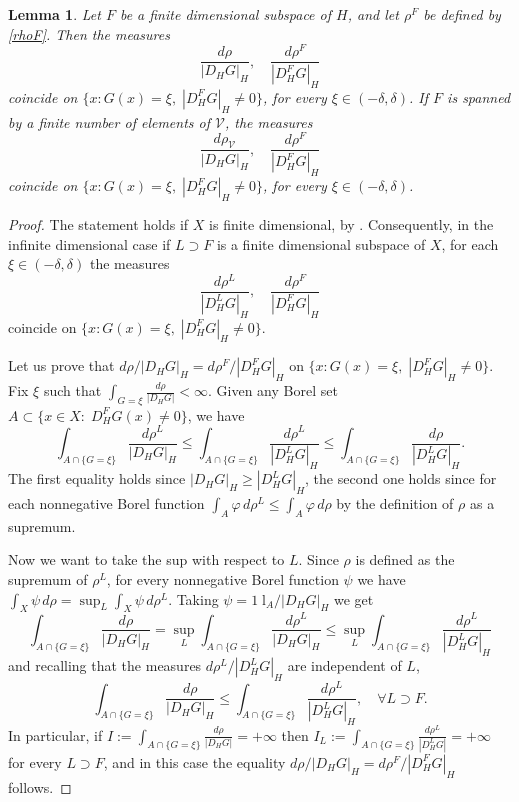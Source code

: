 \documentclass[reqno,twoside,12pt]{amsart}
\newtheorem{Lemma}[Theorem]{Lemma}
\begin{document}
\begin{Lemma}
\label{Le:sofferenza}
Let $F$ be a finite dimensional subspace of  $H$, and let $\rho^F$  be defined by \eqref{rhoF}. Then the measures 
$$\frac{d\rho}{|D_H G|_H} ,   \quad \frac{d\rho^F}{|D_H^FG|_H} $$
coincide on $\{ x: G(x) = \xi, \; |D_H^FG|_H\neq 0\}$, for every $\xi \in (-\delta, \delta)$. 
If $F$ is spanned by a finite number of elements of $\mathcal V$, the measures
$$ \frac{d\rho_{\mathcal V}}{|D_H G|_H} , \quad \frac{d\rho^F}{|D_H^FG|_H} $$
coincide on $\{ x: G(x) = \xi, \; |D_H^FG|_H\neq 0\}$, for every $\xi \in (-\delta, \delta)$. 
\end{Lemma}
\begin{proof}
The statement holds if $X$ is finite dimensional, by  \cite[Cor. 6.3]{Feyel}. Consequently, in the infinite dimensional case if $L\supset F$ is a finite dimensional subspace of $X$, for each  $\xi \in (-\delta, \delta)$ the measures
$$\frac{d\rho^L}{|D_H^LG|_H} , \quad \frac{d\rho^F}{|D_H^FG|_H} $$
coincide on  $\{ x: G(x) = \xi, \; |D_H^FG|_H\neq 0\}$. 

Let us prove that $ d\rho/|D_H G|_H= d\rho^F/|D_H^FG|_H  $ on $\{ x: G(x) = \xi, \; |D_H^FG|_H\neq 0\}$. 
Fix $\xi$ such that   $\int_{G=\xi }\frac{d\rho}{|D_H G| }<\infty$. Given any Borel set $A \subset \{x\in X:  \;D_H^FG(x) \neq 0\}$, we have
 \begin{equation}
\label{disugL}
\int_{A \cap \{G = \xi\}} \frac{d\rho ^L}{|D_H G|_H}  \leq \int_{A \cap \{G = \xi\}} \frac{d\rho^L}{|D_H^LG|_H} \leq \int_{A \cap \{G  = \xi\}} \frac{d\rho }{|D_H^LG|_H} .\end{equation}
 The first equality holds since $|D_H G|_H\geq |D_H^LG|_H$, the second one holds since for each nonnegative Borel function  $\int_A \varphi \,d\rho^L  \leq \int_A \varphi \,d\rho$ by the definition of  $\rho$ as a supremum. 

Now we want to take the sup with respect to $L$.  
Since  $\rho$ is defined as the supremum of  $\rho ^L$, for every nonnegative Borel function $\psi$ we have  $\int_X \psi\,d\rho = \sup_L \int_X \psi\,d\rho^L$. Taking  $\psi = {1\!\!\!\;\mathrm{l}}_A/|D_H G|_H$  we get
$$ \int_{A \cap \{G = \xi\}} \frac{d\rho  }{|D_H G|_H} =  \sup_{L} \int_{A \cap \{G = \xi\}} \frac{d\rho ^L}{|D_H G|_H}  \leq  \sup_{L} \int_{A \cap \{G = \xi\}} \frac{d\rho ^L}{|D_H^LG|_H}  $$
and recalling that the measures $d\rho ^L/|D_H^LG|_H$ are independent of $L$, 
$$ \int_{A \cap \{G = \xi\}} \frac{d\rho  }{|D_H G|_H} \leq  \int_{A \cap \{G = \xi\}} \frac{d\rho ^L}{|D_H^LG|_H}, \quad \forall L\supset F .$$
In particular, if  $I:= \int_{A \cap \{G = \xi\}} \frac{d\rho  }{|D_H G|} =+\infty$ then  $I_L:=\int_{A \cap \{G = \xi\}} \frac{d\rho ^L}{|D_H^LG|}= +\infty$ for every  $L\supset F$, and in this case the equality $d\rho/|D_H G|_H=d\rho^F/|D_H^FG|_H$ follows. 


\end{proof}
\end{document}
